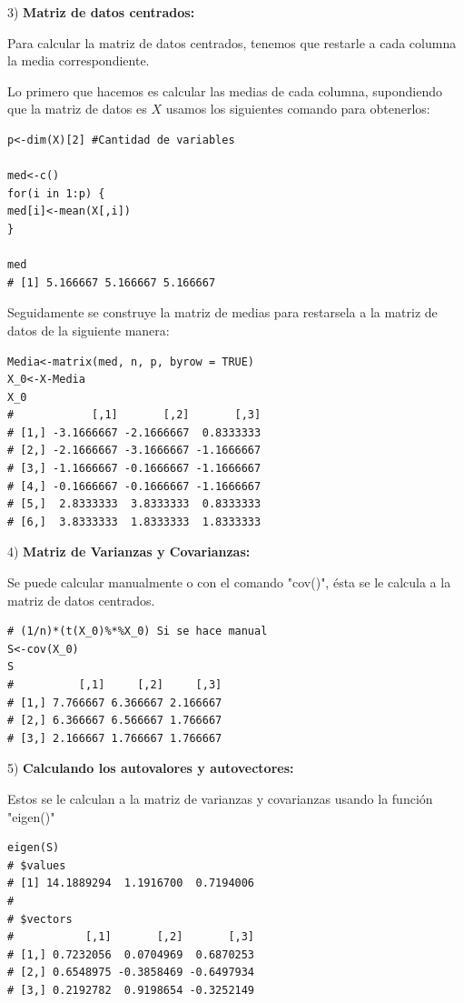 \documentclass[12pt,letterpaper]{report} %
\begin{document}
3) \textbf{Matriz de datos centrados:}

Para calcular la matriz de datos centrados, tenemos que restarle a cada columna la media correspondiente.

Lo primero que hacemos es calcular las medias de cada columna, supondiendo que la matriz de datos es $X$ usamos los siguientes comando para obtenerlos:

\begin{lstlisting}
p<-dim(X)[2] #Cantidad de variables

med<-c()
for(i in 1:p) {
med[i]<-mean(X[,i])
}

med
# [1] 5.166667 5.166667 5.166667
\end{lstlisting}

Seguidamente se construye la matriz de medias para restarsela a la matriz de datos de la siguiente manera:

\begin{lstlisting}
Media<-matrix(med, n, p, byrow = TRUE)
X_0<-X-Media
X_0
#            [,1]       [,2]       [,3]
# [1,] -3.1666667 -2.1666667  0.8333333
# [2,] -2.1666667 -3.1666667 -1.1666667
# [3,] -1.1666667 -0.1666667 -1.1666667
# [4,] -0.1666667 -0.1666667 -1.1666667
# [5,]  2.8333333  3.8333333  0.8333333
# [6,]  3.8333333  1.8333333  1.8333333
\end{lstlisting}

4) \textbf{Matriz de Varianzas y Covarianzas:}

Se puede calcular manualmente o con el comando "cov()", ésta se le calcula a la matriz de datos centrados.

\begin{lstlisting}
# (1/n)*(t(X_0)%*%X_0) Si se hace manual
S<-cov(X_0)
S
#          [,1]     [,2]     [,3]
# [1,] 7.766667 6.366667 2.166667
# [2,] 6.366667 6.566667 1.766667
# [3,] 2.166667 1.766667 1.766667
\end{lstlisting}

5) \textbf{Calculando los autovalores y autovectores:}

Estos se le calculan a la matriz de varianzas y covarianzas usando la función "eigen()"

\begin{lstlisting}
eigen(S)
# $values
# [1] 14.1889294  1.1916700  0.7194006
#
# $vectors
#           [,1]       [,2]       [,3]
# [1,] 0.7232056  0.0704969  0.6870253
# [2,] 0.6548975 -0.3858469 -0.6497934
# [3,] 0.2192782  0.9198654 -0.3252149
\end{lstlisting}
\end{document}

